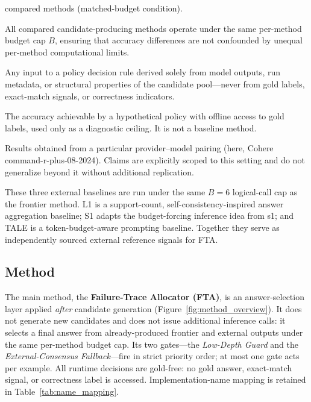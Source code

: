 \documentclass[smallcondensed]{svjour3}
\begin{document}
\begin{description}[leftmargin=2.2cm, labelwidth=2cm, labelsep=0.2cm, style=nextline]
    compared methods (matched-budget condition).
  \item[Matched budget] All compared candidate-producing methods operate under
    the same per-method budget cap $B$, ensuring that accuracy differences are
    not confounded by unequal per-method computational limits.
  \item[Gold-free runtime feature] Any input to a policy decision rule derived
    solely from model outputs, run metadata, or structural properties of the
    candidate pool---never from gold labels, exact-match signals, or
    correctness indicators.
  \item[Oracle upper bound] The accuracy achievable by a hypothetical policy
    with offline access to gold labels, used only as a diagnostic ceiling.
    It is not a baseline method.
  \item[Provider-specific evidence] Results obtained from a particular
    provider--model pairing (here, Cohere command-r-plus-08-2024).
    Claims are explicitly scoped to this setting and do not generalize beyond
    it without additional replication.
\end{description}

These three external baselines are run under the same $B = 6$ logical-call cap
as the frontier method. L1 is a support-count, self-consistency-inspired answer
aggregation baseline; S1 adapts the budget-forcing inference idea from s1; and
TALE is a token-budget-aware prompting baseline. Together they serve as
independently sourced external reference signals for FTA.

\subsection{Method}
\label{sec:method}

The main method, the \textbf{Failure-Trace Allocator (FTA)}, is an
answer-selection layer applied \emph{after} candidate generation
(Figure~\ref{fig:method_overview}).
It does not generate new candidates and does not issue additional inference
calls: it selects a final answer from already-produced frontier and external
outputs under the same per-method budget cap.
Its two gates---the \emph{Low-Depth Guard} and the
\emph{External-Consensus Fallback}---fire in strict priority order; at most
one gate acts per example.
All runtime decisions are gold-free: no gold answer, exact-match signal, or
correctness label is accessed.
Implementation-name mapping is retained in Table~\ref{tab:name_mapping}.
\end{document}
